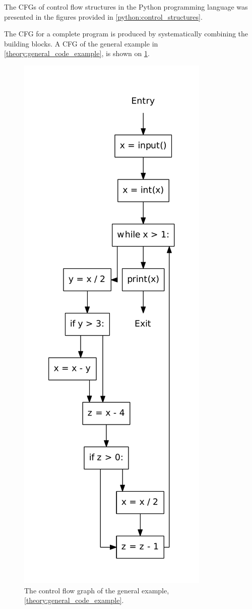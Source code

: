The CFGs of control flow structures in the Python programming language was presented in the figures provided in \cref{python:control_structures}.

The CFG for a complete program is produced by systematically combining the building blocks.
A CFG of the general example in \cref{theory:general_code_example}, is shown on \cref{theory:general_code_example_cfg}.

\begin{figure}
  \center
  \includegraphics[height=\textheight]{figures/general_example.pdf}
  \caption{The control flow graph of the general example, \cref{theory:general_code_example}.}
  \label{theory:general_code_example_cfg}
\end{figure}
